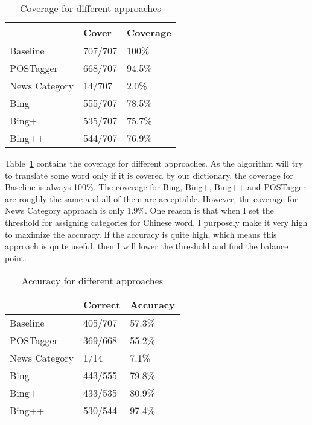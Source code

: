 \begin{CJK}{UTF8}{gbsn}
\begin{table}[ht]
  \caption{Coverage for different approaches}
  \label{table:evaluation_1}
  \begin{tabular}{| p{2cm} | p{2cm} | p{2cm} |}
    \hline
     & Cover & Coverage\\
    \hline
    Baseline & 707/707 & 100\%\\
    \hline
    POSTagger & 668/707 & 94.5\%\\
    \hline
    News Category & 14/707 & 2.0\%\\
    \hline
    Bing & 555/707 & 78.5\%\\
    \hline
    Bing+ & 535/707 & 75.7\%\\
    \hline
    Bing++ & 544/707 & 76.9\%\\
    \hline
  \end{tabular}
\end{table}

Table~\ref{table:evaluation_1} contains the coverage for different approaches. As the algorithm will try to translate some word only if it is covered by our dictionary, the coverage for Baseline is always 100\%. The coverage for Bing, Bing+, Bing++ and POSTagger are roughly the same and all of them are acceptable. However, the coverage for News Category approach is only 1.9\%. One reason is that when I set the threshold for assigning categories for Chinese word, I purposely make it very high to maximize the accuracy. If the accuracy is quite high, which means this approach is quite useful, then I will lower the threshold and find the balance point.

\begin{table}[ht]
  \caption{Accuracy for different approaches}
  \label{table:evaluation_3}
  \begin{tabular}{| p{2cm} | p{2cm} | p{2cm} |}
    \hline
     & Correct & Accuracy\\
    \hline
    Baseline & 405/707 & 57.3\%\\
    \hline
    POSTagger & 369/668 & 55.2\%\\
    \hline
    News Category & 1/14 & 7.1\%\\
    \hline
    Bing & 443/555 & 79.8\%\\
    \hline
    Bing+ & 433/535 & 80.9\%\\
    \hline
    Bing++ & 530/544 & 97.4\%\\
    \hline
  \end{tabular}
\end{table}


\end{CJK}
